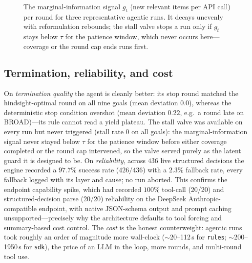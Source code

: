 \documentclass[conference]{IEEEtran}
\newcommand{\code}[1]{\texttt{\small #1}}
\begin{document}
\begin{figure}[t]
\centering
{}
\caption{The marginal-information signal $g_t$ (new relevant items per API call) per round for three representative agentic runs. It decays unevenly with reformulation rebounds; the stall valve stops a run only if $g_t$ stays below $\tau$ for the patience window, which never occurs here---coverage or the round cap ends runs first.}
\label{fig:infogain}
\end{figure}

\subsection{Termination, reliability, and cost}
\label{sec:term-result}

On \emph{termination quality} the agent is cleanly better: its stop round matched the hindsight-optimal round on all nine goals (mean deviation $0.0$), whereas the deterministic stop condition overshot (mean deviation $0.22$, e.g.\ a round late on BROAD)---its rule cannot read a yield plateau. The stall valve was available on every run but never triggered (stall rate $0$ on all goals): the marginal-information signal never stayed below $\tau$ for the patience window before either coverage completed or the round cap intervened, so the valve served purely as the latent guard it is designed to be. On \emph{reliability}, across $436$ live structured decisions the engine recorded a $97.7\%$ success rate ($426/436$) with a $2.3\%$ fallback rate, every fallback logged with its layer and cause; no run aborted. This confirms the endpoint capability spike, which had recorded $100\%$ tool-call (20/20) and structured-decision parse (20/20) reliability on the DeepSeek Anthropic-compatible endpoint, with native JSON-schema output and prompt caching unsupported---precisely why the architecture defaults to tool forcing and summary-based cost control. The \emph{cost} is the honest counterweight: agentic runs took roughly an order of magnitude more wall-clock ($\sim$20--112\,s for \code{rules}; $\sim$200--1950\,s for \code{sdk}), the price of an LLM in the loop, more rounds, and multi-round tool use.
\end{document}
